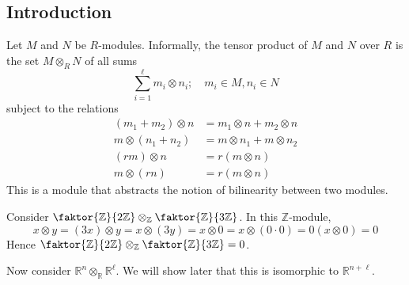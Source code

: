 \subsection{Introduction}
Let \( M \) and \( N \) be \( R \)-modules.
Informally, the tensor product of \( M \) and \( N \) over \( R \) is the set \( M \otimes_R N \) of all sums
\[ \sum_{i=1}^\ell m_i \otimes n_i;\quad m_i \in M, n_i \in N \]
subject to the relations
\begin{align*}
    (m_1 + m_2) \otimes n &= m_1 \otimes n + m_2 \otimes n \\
    m \otimes (n_1 + n_2) &= m \otimes n_1 + m \otimes n_2 \\
    (rm) \otimes n &= r(m \otimes n) \\
    m \otimes (rn) &= r(m \otimes n)
\end{align*}
This is a module that abstracts the notion of bilinearity between two modules.
\begin{example}
    Consider \( \faktor{\mathbb Z}{2\mathbb Z} \otimes_{\mathbb Z} \faktor{\mathbb Z}{3\mathbb Z} \).
    In this \( \mathbb Z \)-module,
    \[ x \otimes y = (3x) \otimes y = x \otimes (3y) = x \otimes 0 = x \otimes (0 \cdot 0) = 0 (x \otimes 0) = 0 \]
    Hence \( \faktor{\mathbb Z}{2\mathbb Z} \otimes_{\mathbb Z} \faktor{\mathbb Z}{3\mathbb Z} = 0 \).
\end{example}
\begin{example}
    Now consider \( {\mathbb R}^n \otimes_{\mathbb R} {\mathbb R}^\ell \).
    We will show later that this is isomorphic to \( \mathbb R^{n+\ell} \).
\end{example}


